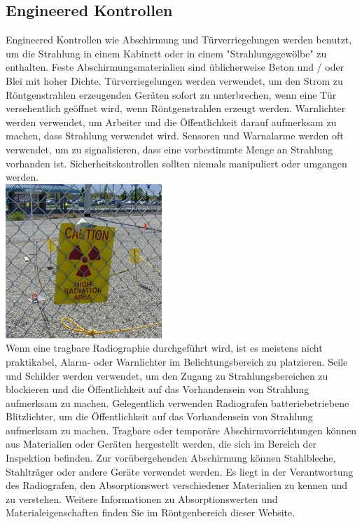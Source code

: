 \subsection{Engineered Kontrollen}
Engineered Kontrollen wie Abschirmung und Türverriegelungen werden benutzt, um die Strahlung in einem Kabinett oder in einem "Strahlungsgewölbe" zu enthalten.
Feste Abschirmungsmaterialien sind üblicherweise Beton und / oder Blei mit hoher Dichte. Türverriegelungen werden verwendet, um den Strom zu Röntgenstrahlen erzeugenden Geräten sofort zu unterbrechen, wenn eine Tür versehentlich geöffnet wird, wenn Röntgenstrahlen erzeugt werden. Warnlichter werden verwendet, um Arbeiter und die Öffentlichkeit darauf aufmerksam zu machen, dass Strahlung verwendet wird. Sensoren und Warnalarme werden oft verwendet, um zu signalisieren, dass eine vorbestimmte Menge an Strahlung vorhanden ist. Sicherheitskontrollen sollten niemals manipuliert oder umgangen werden.\\
\includegraphics[scale=0.9]{img/safetyshild.jpg}\\
Wenn eine tragbare Radiographie durchgeführt wird, ist es meistens nicht praktikabel, Alarm- oder Warnlichter im Belichtungsbereich zu platzieren. Seile und Schilder werden verwendet, um den Zugang zu Strahlungsbereichen zu blockieren und die Öffentlichkeit auf das Vorhandensein von Strahlung aufmerksam zu machen. Gelegentlich verwenden Radiografen batteriebetriebene Blitzlichter, um die Öffentlichkeit auf das Vorhandensein von Strahlung aufmerksam zu machen. Tragbare oder temporäre Abschirmvorrichtungen können aus Materialien oder Geräten hergestellt werden, die sich im Bereich der Inspektion befinden. Zur vorübergehenden Abschirmung können Stahlbleche, Stahlträger oder andere Geräte verwendet werden. Es liegt in der Verantwortung des Radiografen, den Absorptionswert verschiedener Materialien zu kennen und zu verstehen. Weitere Informationen zu Absorptionswerten und Materialeigenschaften finden Sie im Röntgenbereich dieser Website.
